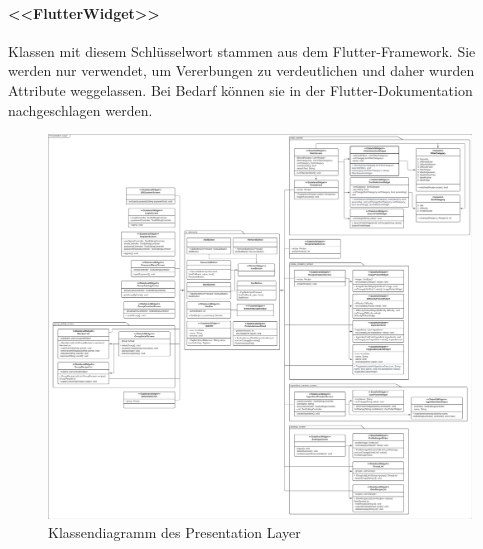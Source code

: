 \documentclass{entwurfsheft}
\begin{document}
\begin{sloppypar}
\paragraph{<<FlutterWidget>>} Klassen mit diesem Schlüsselwort stammen aus dem Flutter-Framework. Sie werden nur verwendet, um Vererbungen zu verdeutlichen und daher wurden Attribute weggelassen. Bei Bedarf können sie in der Flutter-Dokumentation nachgeschlagen werden.
\begin{figure}[htp]
    \centering
    \includegraphics[width = \textwidth]{images/presentationLayer/classDiagrams/presentationLayer.pdf}
    \caption{Klassendiagramm des Presentation Layer}
    \label{fig:presentation-layer}
\end{figure}
\newpage


\end{sloppypar}
\end{document}
